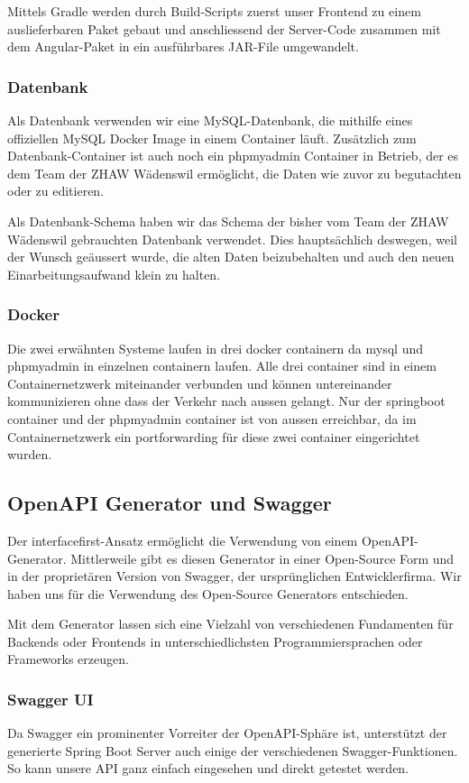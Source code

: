 \documentclass[../main.tex]{subfiles}
\begin{document}
	\noindent Mittels Gradle werden durch Build-Scripts zuerst unser Frontend zu einem auslieferbaren Paket gebaut und anschliessend der Server-Code zusammen mit dem Angular-Paket in ein ausführbares JAR-File umgewandelt.
	
	\subsubsection{Datenbank}
	Als Datenbank verwenden wir eine MySQL-Datenbank, die mithilfe eines offiziellen MySQL Docker Image in einem Container läuft. Zusätzlich zum Datenbank-Container ist auch noch ein \gls{phpmyadmin} Container in Betrieb, der es dem Team der ZHAW Wädenswil ermöglicht, die Daten wie zuvor zu begutachten oder zu editieren.
	
	\noindent Als Datenbank-Schema haben wir das Schema der bisher vom Team der ZHAW Wädenswil gebrauchten Datenbank verwendet. Dies hauptsächlich deswegen, weil der Wunsch geäussert wurde, die alten Daten beizubehalten und auch den neuen Einarbeitungsaufwand klein zu halten.
	
	\subsubsection{Docker}
	Die zwei erwähnten Systeme laufen in drei \gls{docker} \gls{container}n da \gls{mysql} und \gls{phpmyadmin} in einzelnen \gls{container}n laufen. Alle drei \gls{container} sind in einem Containernetzwerk miteinander verbunden und können untereinander kommunizieren ohne dass der Verkehr nach aussen gelangt. Nur der \gls{springboot} \gls{container} und der \gls{phpmyadmin} \gls{container} ist von aussen erreichbar, da im Containernetzwerk ein \gls{portforwarding} für diese zwei \gls{container} eingerichtet wurden.
	
	\subsection{OpenAPI Generator und Swagger}
	Der \gls{interfacefirst}-Ansatz ermöglicht die Verwendung von einem OpenAPI-Generator. Mittlerweile gibt es diesen Generator in einer Open-Source Form und in der proprietären Version von Swagger, der ursprünglichen Entwicklerfirma. Wir haben uns für die Verwendung des Open-Source Generators entschieden.
	
	\noindent Mit dem Generator lassen sich eine Vielzahl von verschiedenen Fundamenten für Backends oder Frontends in unterschiedlichsten Programmiersprachen oder Frameworks erzeugen.
	
	\subsubsection{Swagger UI}
	Da Swagger ein prominenter Vorreiter der OpenAPI-Sphäre ist, unterstützt der generierte Spring Boot Server auch einige der verschiedenen Swagger-Funktionen. So kann unsere API ganz einfach eingesehen und direkt getestet werden.
	
\end{document}

